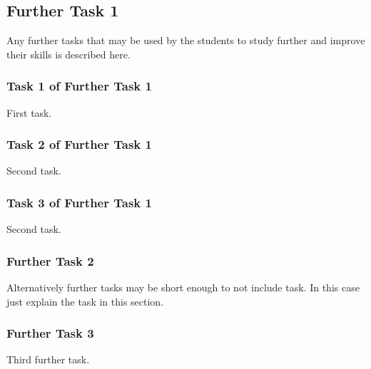 \documentclass[a4paper]{article}
\begin{document}
	\subsection{Further Task 1}
	Any further tasks that may be used by the students to study further and improve their skills is described here.
	
	\subsubsection{Task 1 of Further Task 1}
	First task.
	
	\subsubsection{Task 2 of Further Task 1}
	Second task.
	
	\subsubsection{Task 3 of Further Task 1}
	Second task.
	
	\subsubsection{Further Task 2}
	Alternatively further tasks may be short enough to not include task. In this case just explain the task in this section.
	
	\subsubsection{Further Task 3}
	Third further task.
	
\end{document}
